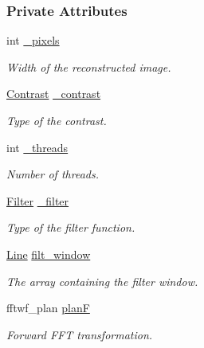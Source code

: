 \subsubsection*{Private Attributes}
\begin{DoxyCompactItemize}
\item 
int \hyperlink{classCTrec_a91849845389f46350ac0bc79e2e43486}{\_\-pixels}
\begin{DoxyCompactList}\small\item\em Width of the reconstructed image. \item\end{DoxyCompactList}\item 
\hyperlink{classContrast}{Contrast} \hyperlink{classCTrec_a4a2c0cea76273f93c7bd69d10b090c1a}{\_\-contrast}
\begin{DoxyCompactList}\small\item\em Type of the contrast. \item\end{DoxyCompactList}\item 
int \hyperlink{classCTrec_aff2191f8d346c015b4df15e05d3a0d31}{\_\-threads}
\begin{DoxyCompactList}\small\item\em Number of threads. \item\end{DoxyCompactList}\item 
\hyperlink{classFilter}{Filter} \hyperlink{classCTrec_a57ae11bb07c6d1015eab118a8e68cc7f}{\_\-filter}
\begin{DoxyCompactList}\small\item\em Type of the filter function. \item\end{DoxyCompactList}\item 
\hyperlink{group__Types_ga4ce3fdeba27702c8b09a141e22709e38}{Line} \hyperlink{classCTrec_a68ba6426b5de1fc98b63ff6c88d402f4}{filt\_\-window}
\begin{DoxyCompactList}\small\item\em The array containing the filter window. \item\end{DoxyCompactList}\item 
fftwf\_\-plan \hyperlink{classCTrec_a18670a29e97fab9f49e3a0060ddcd071}{planF}
\begin{DoxyCompactList}\small\item\em Forward FFT transformation. \item\end{DoxyCompactList}\item 

\end{DoxyCompactItemize}
